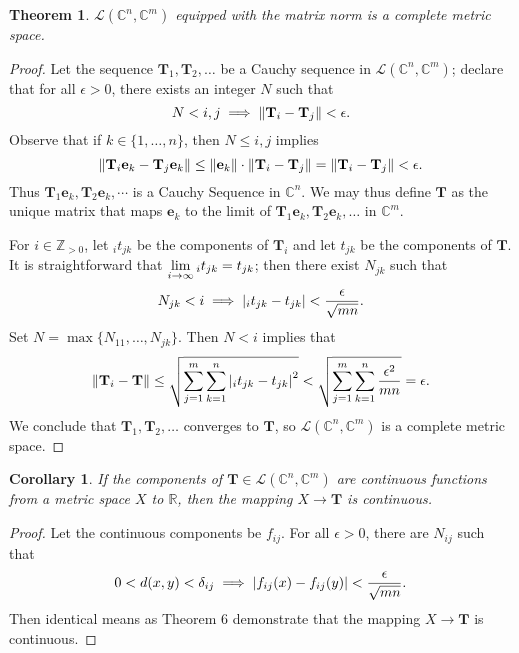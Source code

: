 \documentclass[11pt]{article}
\renewcommand{\vec}[1]{\mathbf{#1}}
\newcommand{\mat}[1]{\mathbf{#1}}
\newtheorem{theorem}{Theorem}
\newtheorem{corollary}{Corollary}
\begin{document}
\begin{theorem}
	$\mathcal{L}(\mathbb{C}^{n}, \mathbb{C}^{m})$ equipped with the matrix norm is a complete metric space.
\end{theorem}
\begin{adjustwidth}{0.5cm}{}
    \begin{proof}
		Let the sequence $\mat{T}_{1}, \mat{T}_{2}, \ldots$ be a Cauchy sequence in $\mathcal{L}(\mathbb{C}^{n}, \mathbb{C}^{m})$; declare that for all $\epsilon > 0$, there exists an integer $N$ such that
		\[
			N < i, j \implies \norm{\mat{T}_{i} - \mat{T}_{j}} < \epsilon.
		\]
		Observe that if $k \in \{ 1, \ldots, n \}$, then $N \le i, j$ implies
		\[
			\norm{\mat{T}_{i} \vec{e}_{k} - \mat{T}_{j} \vec{e}_{k}} \le \norm{\vec{e}_{k}} \cdot \norm{\mat{T}_{i} - \mat{T}_{j}} = \norm{\mat{T}_{i} - \mat{T}_{j}} < \epsilon.
		\]
		Thus $\mat{T}_{1} \vec{e}_{k}, \mat{T}_{2} \vec{e}_{k}, \cdots$ is a Cauchy Sequence in $\mathbb{C}^{n}$. We may thus define $\mat{T}$ as the unique matrix that maps $\vec{e}_{k}$ to the limit of $\mat{T}_{1} \vec{e}_{k}, \mat{T}_{2} \vec{e}_{k}, \ldots$ in $\mathbb{C}^{m}$.
		
		For $i \in \mathbb{Z}_{> 0}$, let $_{i} t_{jk}$ be the components of $\mat{T}_{i}$ and let $t_{jk}$ be the components of $\mat{T}$. It is straightforward that $\lim\limits_{i \to \infty} \null_{i} t_{jk} = t_{jk}$; then there exist $N_{jk}$ such that
		\[
			N_{jk} < i \implies \abs{_{i} t_{jk} - t_{jk}} < \frac{\epsilon}{\sqrt{mn}}.
		\]
		Set $N = \max \{ N_{11}, \ldots, N_{jk} \}$. Then $N < i$ implies that
		\[
			\norm{\mat{T}_{i} - \mat{T}} \le \sqrt{\sum\limits_{j = 1}^{m} \sum\limits_{k = 1}^{n} \abs{_{i} t_{jk} - t_{jk}}^{2}} < \sqrt{\sum\limits_{j = 1}^{m} \sum\limits_{k = 1}^{n} \frac{\epsilon^{2}}{mn}} = \epsilon.
		\]
		We conclude that $\mat{T}_{1}, \mat{T}_{2}, \ldots$ converges to $\mat{T}$, so $\mathcal{L}(\mathbb{C}^{n}, \mathbb{C}^{m})$ is a complete metric space.
	\end{proof}
\end{adjustwidth}

\begin{corollary}
	If the components of $\mat{T} \in \mathcal{L}(\mathbb{C}^{n}, \mathbb{C}^{m})$ are continuous functions from a metric space $X$ to $\mathbb{R}$, then the mapping $X \to \mat{T}$ is continuous.
\end{corollary}
\begin{adjustwidth}{0.5cm}{}
	\begin{proof}
		Let the continuous components be $f_{ij}$. For all $\epsilon > 0$, there are $N_{ij}$ such that
		\[
			0 < d(x, y) < \delta_{ij} \implies \abs{f_{ij}(x) - f_{ij}(y)} < \frac{\epsilon}{\sqrt{mn}}.
		\]
		Then identical means as Theorem 6 demonstrate that the mapping $X \to \mat{T}$ is continuous.
	\end{proof}
\end{adjustwidth}
\end{document}
